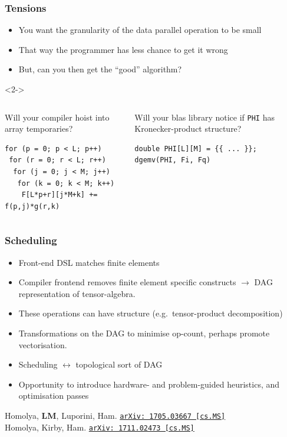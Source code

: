 \documentclass[presentation]{beamer}
\newcommand{\arxivlink}[2]{%
  \href{http://www.arxiv.org/abs/#1}%
  {\texttt{arXiv:\,#1\,[#2]}}%
}
\begin{document}
\begin{frame}[fragile]
  \frametitle{Tensions}
  \begin{itemize}
  \item You want the granularity of the data parallel operation to be
    small
  \item That way the programmer has less chance to get it wrong
  \item But, can you then get the ``good'' algorithm?
  \end{itemize}
  \hspace{0.5\baselineskip}
  \begin{uncoverenv}<2->
    \begin{columns}
      \begin{column}{0.5\textwidth}
        Will your compiler hoist into array temporaries?
\begin{verbatim}
for (p = 0; p < L; p++)
 for (r = 0; r < L; r++)
  for (j = 0; j < M; j++)
   for (k = 0; k < M; k++)
    F[L*p+r][j*M+k] += f(p,j)*g(r,k)
\end{verbatim}
    \end{column}
    \begin{column}{0.5\textwidth}
      Will your blas library notice if \texttt{PHI} has
      Kronecker-product structure?
\begin{verbatim}
double PHI[L][M] = {{ ... }};
dgemv(PHI, Fi, Fq)
\end{verbatim}
    \end{column}
  \end{columns}
\end{uncoverenv}
\end{frame}
\begin{frame}
  \frametitle{Scheduling}
  \begin{itemize}
  \item Front-end DSL matches finite elements
  \item Compiler frontend removes finite element specific constructs $\rightarrow$
    DAG representation of tensor-algebra.
  \item These operations can have structure (e.g.~tensor-product
    decomposition)
  \item Transformations on the DAG to minimise op-count, perhaps
    promote vectorisation.
  \item Scheduling $\leftrightarrow$ topological sort of DAG
  \item Opportunity to introduce hardware- and problem-guided
    heuristics, and optimisation passes
  \end{itemize}
  \begin{flushright}
    {\scriptsize Homolya, \textbf{LM}, Luporini,
      Ham. \arxivlink{1705.03667}{cs.MS}\nocite{Homolya:2017} \\

      Homolya, Kirby, Ham.  \arxivlink{1711.02473}{cs.MS}\nocite{Homolya:2017a}}
  \end{flushright}
\end{frame}
\end{document}

